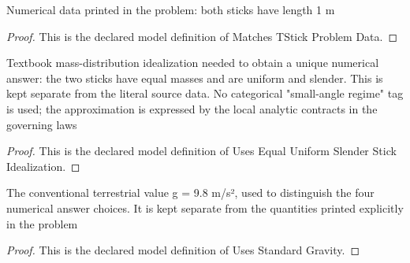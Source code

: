 \begin{definition}
  \label{def:physics:phyx-mini-0263:phyxminiproblems-problemphyxmini0263-matcheststickproblemdata}
  Numerical data printed in the problem: both sticks have length 1 m
\end{definition}
\begin{proof}
  This is the declared model definition of Matches TStick Problem Data.
\end{proof}
\begin{definition}
  \label{def:physics:phyx-mini-0263:phyxminiproblems-problemphyxmini0263-usesequaluniformslenderstickidealization}
  Textbook mass-distribution idealization needed to obtain a unique numerical answer: the two sticks have equal masses and are uniform and slender. This is kept separate from the literal source data. No categorical "small-angle regime" tag is used; the approximation is expressed by the local analytic contracts in the governing laws
\end{definition}
\begin{proof}
  This is the declared model definition of Uses Equal Uniform Slender Stick Idealization.
\end{proof}
\begin{definition}
  \label{def:physics:phyx-mini-0263:phyxminiproblems-problemphyxmini0263-usesstandardgravity}
  The conventional terrestrial value g = 9.8 m/s², used to distinguish the four numerical answer choices. It is kept separate from the quantities printed explicitly in the problem
\end{definition}
\begin{proof}
  This is the declared model definition of Uses Standard Gravity.
\end{proof}
